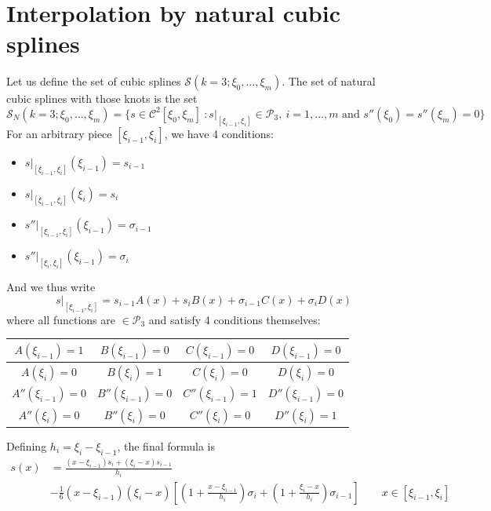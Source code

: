 \documentclass[12pt, openany]{report}
\theoremstyle{definition}
\begin{document}
\section{Interpolation by natural cubic splines}
Let us define the set of cubic splines  $\mathcal{S}(k=3;\xi_0,\dots, \xi_m)$. The set of natural cubic splines with those knots is the set 
\begin{equation}
    \mathcal{S}_N(k=3;\xi_0,\dots,\xi_m)=\{s\in \mathcal{C}^2[\xi_0,\xi_m]\: : s|_{[\xi_{i-1},\xi_i]} \in \mathcal{P}_3,\: i=1,\dots,m\text{ and } s''(\xi_0)=s''(\xi_m) = 0\}
\end{equation}
For an arbitrary piece $[\xi_{i-1}, \xi_i]$, we have 4 conditions:
\begin{itemize}
    \item $s|_{[\xi_{i-1},\xi_i]}(\xi_{i-1})=s_{i-1}$
    \item $s|_{[\xi_{i-1},\xi_i]}(\xi_{i})=s_{i}$
    \item $s''|_{[\xi_{i-1},\xi_i]}(\xi_{i-1})=\sigma_{i-1}$
    \item $s''|_{[\xi_{i},\xi_i]}(\xi_{i-1})=\sigma_{i}$
\end{itemize}
And we thus write 
\begin{equation}
    s|_{[\xi_{i-1},\xi_i]} = s_{i-1}A(x)+s_i B(x) + \sigma_{i-1}C(x)+\sigma_iD(x)
\end{equation}
where all functions are $\in \mathcal{P}_3$ and satisfy 4 conditions themselves:
\begin{center}
    \begin{tabular}{c|c|c|c}
        $A(\xi_{i-1})= 1$ & $B(\xi_{i-1})=0$ & $C(\xi_{i-1})=0$ & $D(\xi_{i-1})=0$\\ \hline
        $A(\xi_{i})=0$ & $B(\xi_{i})=1$ & $C(\xi_{i})=0$ & $D(\xi_{i})=0$\\ \hline
        $A''(\xi_{i-1})= 0$ & $B''(\xi_{i-1})=0$ & $C''(\xi_{i-1})=1$ & $D''(\xi_{i-1})=0$\\ \hline
        $A''(\xi_{i})= 0$ & $B''(\xi_{i})=0$ & $C''(\xi_{i})=0$ & $D''(\xi_{i})=1$\\
    \end{tabular}
\end{center}
Defining $h_i = \xi_i-\xi_{i-1}$, the final formula is 
\begin{align}
    s(x) &= \frac{(x-\xi_{i-1})s_i+(\xi_i-x)s_{i-1}}{h_i}\\
     &-\frac{1}{6}(x-\xi_{i-1})(\xi_i-x)\left[\left(1+ \frac{x-\xi_{i-1}}{h_i}\right)\sigma_i+\left(1+\frac{\xi_i-x}{h_i}\right)\sigma_{i-1}\right] \qquad x\in [\xi_{i-1},\xi_i]
\end{align}
\end{document}
